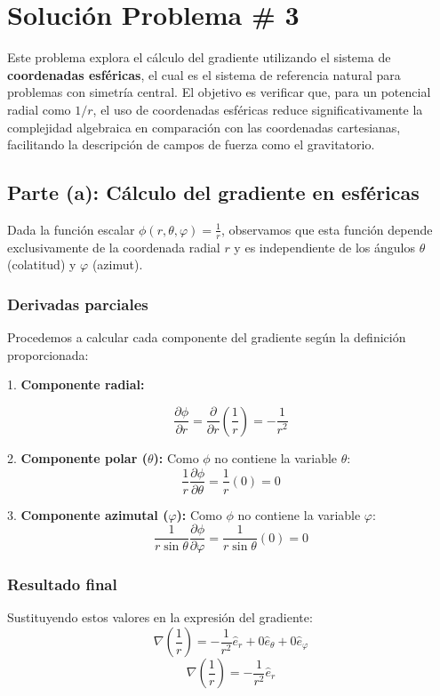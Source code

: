 \documentclass[a4paper]{article}
\begin{document}
\section*{Solución Problema \# 3}

Este problema explora el cálculo del gradiente utilizando el sistema de \textbf{coordenadas esféricas}, el cual es el sistema de referencia natural para problemas con simetría central. El objetivo es verificar que, para un potencial radial como $1/r$, el uso de coordenadas esféricas reduce significativamente la complejidad algebraica en comparación con las coordenadas cartesianas, facilitando la descripción de campos de fuerza como el gravitatorio.

\subsection{Parte (a): Cálculo del gradiente en esféricas}

Dada la función escalar $\phi(r, \theta, \varphi) = \frac{1}{r}$, observamos que esta función depende exclusivamente de la coordenada radial $r$ y es independiente de los ángulos $\theta$ (colatitud) y $\varphi$ (azimut).

\subsubsection{Derivadas parciales}

Procedemos a calcular cada componente del gradiente según la definición proporcionada:

1. \textbf{Componente radial:}

$$ \frac{\partial \phi}{\partial r} = \frac{\partial}{\partial r} \left( \frac{1}{r} \right) = -\frac{1}{r^2} $$

2. \textbf{Componente polar ($\theta$):}
Como $\phi$ no contiene la variable $\theta$:
$$ \frac{1}{r} \frac{\partial \phi}{\partial \theta} = \frac{1}{r} (0) = 0 $$

3. \textbf{Componente azimutal ($\varphi$):}
Como $\phi$ no contiene la variable $\varphi$:
$$ \frac{1}{r \sin \theta} \frac{\partial \phi}{\partial \varphi} = \frac{1}{r \sin \theta} (0) = 0 $$

\subsubsection{Resultado final}

Sustituyendo estos valores en la expresión del gradiente:
$$ \nabla \left( \frac{1}{r} \right) = -\frac{1}{r^2} \hat{e}_r + 0 \hat{e}_\theta + 0 \hat{e}_\varphi $$
$$ \nabla \left( \frac{1}{r} \right) = -\frac{1}{r^2} \hat{e}_r $$
\end{document}
